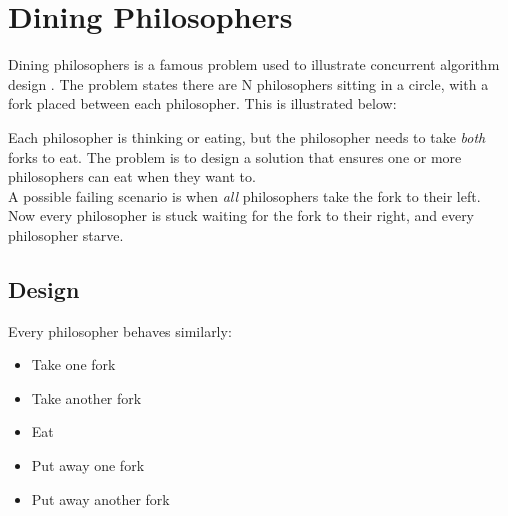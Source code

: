 % 

\chapter{Dining Philosophers}

Dining philosophers is a famous problem used to illustrate concurrent algorithm
design \cite{dining}. The problem states there are N philosophers sitting in a
circle, with a fork placed between each philosopher. This is illustrated
below:\\

\begin{center}
\end{center}

Each philosopher is thinking or eating, but the philosopher needs to take
\textit{both} forks to eat. The problem is to design a solution that ensures one
or more philosophers can eat when they want to. \\

A possible failing scenario is when \textit{all} philosophers take the fork to
their left. Now every philosopher is stuck waiting for the fork to their right, 
and every philosopher starve.

\section{Design}

Every philosopher behaves similarly:
\begin{itemize}
    \item Take one fork 
    \item Take another fork 
    \item Eat
    \item Put away one fork
    \item Put away another fork
\end{itemize}

